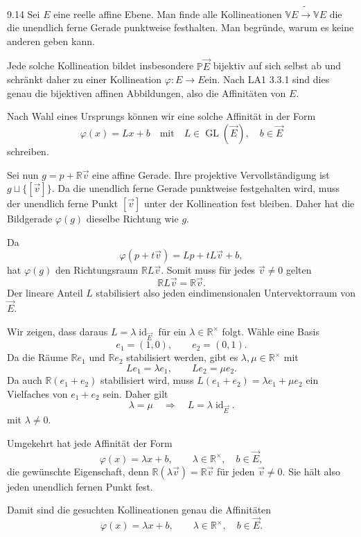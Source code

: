 \begin{exercise}{9.1}{4}
    Sei $E$ eine reelle affine Ebene. Man finde alle Kollineationen $\mathbb V E \tilde{\to}
    \mathbb V E$ die die unendlich ferne Gerade punktweise festhalten. Man begründe, warum
    es keine anderen geben kann.
\end{exercise}

Jede solche Kollineation bildet insbesondere
\(\mathbb P\vec E\) bijektiv auf sich selbst ab und schränkt daher zu
einer Kollineation \(\varphi:E\to E\)ein. Nach LA1 3.3.1 sind dies genau die bijektiven affinen Abbildungen,
also die Affinitäten von \(E\).

Nach Wahl eines Ursprungs können wir eine solche Affinität in der Form
\[
    \varphi(x)=Lx+b \quad \text{mit} \quad L\in\operatorname{GL}(\vec E), \quad b\in\vec E
\]
schreiben.

Sei nun \(g=p+\mathbb R\vec v\) eine affine Gerade. Ihre projektive Vervollständigung ist \(g\sqcup\{[\vec v]\}\).
Da die unendlich ferne Gerade punktweise festgehalten wird, muss der
unendlich ferne Punkt \([\vec v]\) unter der Kollineation fest bleiben.
Daher hat die Bildgerade \(\varphi(g)\) dieselbe Richtung wie \(g\).

Da
\[
    \varphi(p+t\vec v)
    =
    Lp+tL\vec v +b,
\]
hat \(\varphi(g)\) den Richtungsraum \(\mathbb R L\vec v\).
Somit muss für jedes \(\vec v\neq0\) gelten
\[
    \mathbb R L\vec v=\mathbb R\vec v.
\]
Der lineare Anteil \(L\) stabilisiert also jeden eindimensionalen
Untervektorraum von \(\vec E\).

Wir zeigen, dass daraus \(L=\lambda\operatorname{id}_{\vec E} \)
für ein \(\lambda\in\mathbb R^\times\) folgt. Wähle eine Basis
\[
    e_1=(1,0),
    \qquad
    e_2=(0,1).
\]
Da die Räume \(\mathbb Re_1\) und \(\mathbb Re_2\)
stabilisiert werden, gibt es \(\lambda,\mu\in\mathbb R^\times\) mit
\[
    Le_1=\lambda e_1,
    \qquad
    Le_2=\mu e_2.
\]
Da auch \(\mathbb R(e_1+e_2)\)
stabilisiert wird, muss \(L(e_1+e_2)=\lambda e_1+\mu e_2\)
ein Vielfaches von \(e_1+e_2\) sein. Daher gilt
\[
    \lambda=\mu \quad \Longrightarrow \quad L=\lambda\operatorname{id}_{\vec E}.
\]
mit \(\lambda\neq0\).

Umgekehrt hat jede Affinität der Form
\[
    \varphi(x)=\lambda x+b,
    \qquad
    \lambda\in\mathbb R^\times,
    \quad
    b\in\vec E,
\]
die gewünschte Eigenschaft, denn \(\mathbb R(\lambda\vec v)=\mathbb R\vec v\)
für jeden \(\vec v\neq0\). Sie hält also jeden unendlich fernen Punkt
fest.

Damit sind die gesuchten Kollineationen genau die Affinitäten
\[
    \boxed{
        \varphi(x)=\lambda x+b,
        \qquad
        \lambda\in\mathbb R^\times,
        \quad
        b\in\vec E.
    }
\]

